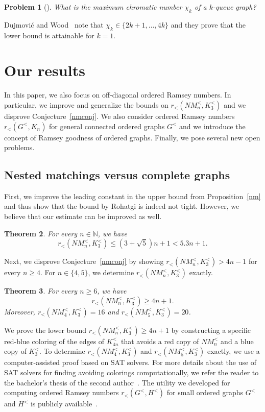 \documentclass[11pt,a4paper]{article}
\newtheorem{thm}{Theorem}%
\newtheorem{problem}[thm]{Problem}
\theoremstyle{remark}
\begin{document}
\begin{problem}[\cite{dujWoo10}]
\label{dujWoodProblem}
What is the maximum chromatic number $\chi_k$ of a $k$-queue graph?
\end{problem} 

Dujmović and Wood~\cite{dujWoo10} note that $\chi_k \in \{2k+1,\dots,4k\}$ and they prove that the lower bound is attainable for $k=1$.










\section{Our results}

In this paper, we also focus on off-diagonal ordered Ramsey numbers.
In particular, we improve and generalize the bounds on $r_<(NM^<_n,K^<_3)$ and we disprove Conjecture~\ref{nmconj}.
We also consider ordered Ramsey numbers $r_<(G^<,K_n)$ for general connected ordered graphs $G^<$ and we introduce the concept of Ramsey goodness of ordered graphs. 
Finally, we pose several new open problems.

\subsection{Nested matchings versus complete graphs}
\label{subsec-nested}

First, we improve the leading constant in the upper bound from Proposition~\ref{nm} and thus show that the bound by Rohatgi is indeed not tight. However, we believe that our estimate can be improved as well.

\begin{thm}
\label{prop:nm5.3}
For every $n\in\mathbb{N}$, we have
\[r_<(NM^<_n,K^<_3)\leq \left(3+\sqrt 5\right)n +1< 5.3n+1.\]
\end{thm}

Next, we disprove Conjecture~\ref{nmconj} by showing $r_<(NM^<_n,K^<_3) > 4n-1$ for every $n \geq 4$.
For $n \in \{4,5\}$, we determine $r_<(NM^<_n,K^<_3)$ exactly.

\begin{thm}
\label{thm:nm_counterexamples}
For every $n\geq6$, we have \[r_<(NM^<_n,K^<_3) \geq 4n+1.\]
Moreover, $r_<(NM^<_4,K^<_3) = 16$ and $r_<(NM^<_5,K^<_3) = 20$. 
\end{thm}

We prove the lower bound $r_<(NM^<_n,K^<_3) \geq 4n+1$ by constructing a specific red-blue coloring of the edges of $K^<_{4n}$ that avoids a red copy of $NM^<_n$ and a blue copy of $K^<_3$. 
To determine $r_<(NM^<_4,K^<_3)$ and $r_<(NM^<_5,K^<_3)$ exactly, we use a computer-assisted proof based on SAT solvers. For more details about the use of SAT solvers for finding avoiding colorings computationally, we refer the reader to the bachelor's thesis of the second author~\cite{bakalarka}. The utility we developed for computing ordered Ramsey numbers $r_<(G^<,H^<)$ for small ordered graphs $G^<$ and $H^<$ is publicly available~\cite{utility}.
\end{document}
